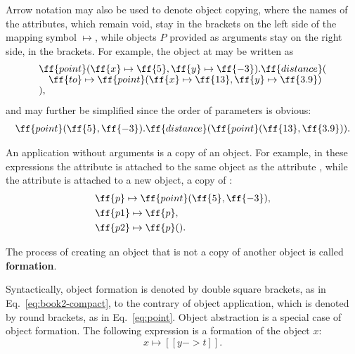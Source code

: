 Arrow notation may also be used to denote object copying,
where the names of the attributes, which remain void, stay in the brackets
on the left side of the mapping symbol \(\mapsto\),
while objects \(P\) provided as arguments stay on the right side,
in the brackets. For example, the object at  may be written as
\begin{equation}\label{eq:point}
\begin{split}
& \ff{point}(\ff{x} \mapsto \ff{5}, \ff{y} \mapsto \ff{-3}).\ff{distance}(\br
& \quad \ff{to} \mapsto \ff{point}(\ff{x} \mapsto \ff{13}, \ff{y} \mapsto \ff{3.9}) \br
& ),
\end{split}
\end{equation}
and may further be simplified since the order of parameters is obvious:
\begin{equation}
\begin{split}
\ff{point}(\ff{5}, \ff{-3}).\ff{distance}(\ff{point}(\ff{13}, \ff{3.9})).
\end{split}
\end{equation}

An application without arguments is a copy of an object. For example,
in these expressions the attribute  is attached to the same object
as the attribute , while the attribute  is attached to a new
object, a copy of :
\begin{equation*}
\begin{split}
& \ff{p} \mapsto \ff{point}(\ff{5}, \ff{-3}),\\
& \ff{p1} \mapsto \ff{p},\\
& \ff{p2} \mapsto \ff{p}().\\
\end{split}
\end{equation*}

\begin{definition}\label{def:formation}
The process of creating an object that is not a copy of another object
is called \textbf{formation}.
\end{definition}

Syntactically, object formation is denoted by double square brackets,
as in Eq.~\ref{eq:book2-compact}, to the contrary of object application,
which is denoted by round brackets, as in Eq.~\ref{eq:point}.
Object abstraction is a special case of object formation.
The following expression is a formation of the object \(x\):
\begin{equation*}
x \mapsto [[ y -> t ]].
\end{equation*}

